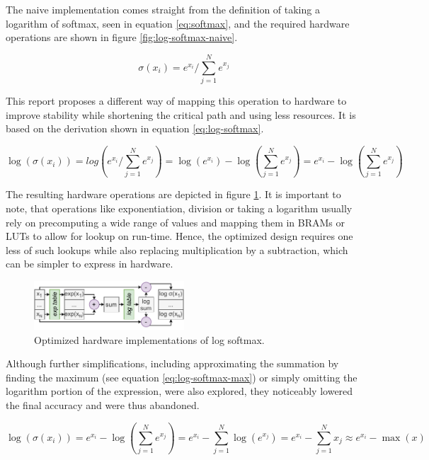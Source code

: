 The naive implementation comes straight from the definition of taking a logarithm of softmax, seen in equation \ref{eq:softmax}, and the required hardware operations are shown in figure \ref{fig:log-softmax-naive}.

\begin{equation} \label{eq:softmax}
    \sigma (x_i) = e^{x_i} / \sum_{j=1}^{N} e^{x_j}
\end{equation}

This report proposes a different way of mapping this operation to hardware to improve stability while shortening the critical path and using less resources. It is based on the derivation shown in equation \ref{eq:log-softmax}.

\begin{equation} \label{eq:log-softmax}
    \log (\sigma (x_i)) = log(e^{x_i} / \sum_{j=1}^{N} e^{x_j}) = \log(e^{x_i}) - \log(\sum_{j=1}^{N} e^{x_j}) = e^{x_i} - \log(\sum_{j=1}^{N} e^{x_j})
\end{equation}

The resulting hardware operations are depicted in figure \ref{fig:log-softmax-opt}. It is important to note, that operations like exponentiation, division or taking a logarithm usually rely on precomputing a wide range of values and mapping them in BRAMs or LUTs to allow for lookup on run-time. Hence, the optimized design requires one less of such lookups while also replacing multiplication by a subtraction, which can be simpler to express in hardware.

\begin{figure}[hpt!]
  \centering
  \includegraphics[trim={0cm 0cm 0cm 0cm}, width=0.5\textwidth, center]{quantization/log_softmax_opt_h.pdf}
  \caption{Optimized hardware implementations of log softmax.}
  \label{fig:log-softmax-opt}
\end{figure}

\clearpage
Although further simplifications, including approximating the summation by finding the maximum (see equation \ref{eq:log-softmax-max}) or simply omitting the logarithm portion of the expression, were also explored, they noticeably lowered the final accuracy and were thus abandoned. 

\begin{equation} \label{eq:log-softmax-max}
    \log (\sigma (x_i)) = e^{x_i} - \log(\sum_{j=1}^{N} e^{x_j}) = e^{x_i} - \sum_{j=1}^{N} \log(e^{x_j}) = e^{x_i} - \sum_{j=1}^{N} x_j \approx e^{x_i} - \max(x)
\end{equation}


